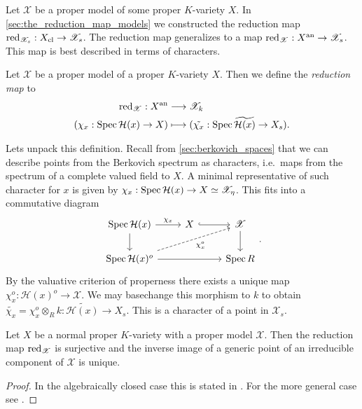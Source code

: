 Let $\mathscr X$ be a proper model of some proper $K$-variety $X$.
In \cref{sec:the_reduction_map_models} we constructed the reduction map $\operatorname{red}_{\mathscr X_s}: X_\text{cl}  \to \mathscr X_s$. 
The reduction map generalizes to a map $\operatorname{red}_{\mathscr X}: X{}^{\text{an}} \to \mathscr X_s$.
This map is best described in terms of characters. 
\begin{definition}
	Let $\mathscr X$ be a proper model of a proper $K$-variety $X$. 
	Then we define the \emph{reduction map} to 
	\begin{align*}
		\operatorname{red}_{\mathscr X}:  X{}^{\text{an}} &\longrightarrow \mathscr X_k \\
		(\chi_x: \operatorname{Spec} \mathcal H(x) \to X) &\longmapsto (\tilde{\chi_x}: \operatorname{Spec} \widetilde{\mathcal H (x)} \to X_s)
	.\end{align*}
\end{definition}
Lets unpack this definition. 
Recall from \cref{sec:berkovich_spaces} that we can describe points from the Berkovich spectrum as characters, i.e.\ maps from the spectrum of a complete valued field to $X$.
A minimal representative of such character for $x$ is given by $\chi_x: \operatorname{Spec} \mathcal{H} (x) \to X \simeq \mathscr X_\eta$. 
This fits into a commutative diagram \[
\begin{tikzcd}
	\spec \mathcal{H} (x) \dar \rar{\chi_x} & X \rar[hookrightarrow] & \mathscr X \dar \\ 
	\spec \mathcal{H} (x)^{o} \ar[dashed]{urr}[']{\chi_x^{o}} \ar{rr} & & \spec R
\end{tikzcd}
.\] 
By the valuative criterion of properness there exists a unique map $\chi_x^{o}: \mathcal{H} (x)^{o} \to \mathscr X$. 
We may basechange this morphism to  $k$ to obtain $\widetilde{\chi_x} = \chi_x^{o} \otimes_R k: \widetilde{\mathcal{H} (x)} \to X_s$. 
This is a character of a point in $\mathscr X_s$. 


\begin{proposition}
	Let $X$ be a normal proper $K$-variety with a proper model $\mathscr X$. 
	Then the reduction map  $\operatorname{red}_{\mathscr X}$ is surjective and the inverse image of a generic point of an irreducible component of $\mathscr X$ is unique. 
\end{proposition}
\begin{proof}
	In the algebraically closed case this is stated in \cite[\S 1.3]{bakerStructureNonarchimedeanAnalytic2013}. 
	For the more general case see \cite[prop. 2.4.4]{berkovichSpectralTheoryAnalytic2012}. 
\end{proof}



